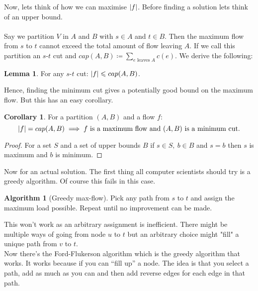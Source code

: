 \documentclass[11pt,a4paper, titlepage]{article}
\DeclarePairedDelimiter\abs{\lvert}{\rvert}
\theoremstyle{definition}
\newtheorem{corollary}[theorem]{Corollary}
\newtheorem{lemma}[theorem]{Lemma}
\newtheorem{algo}[theorem]{Algorithm}
\begin{document}
Now, lets think of how we can maximise $\abs{f}$. Before finding a solution lets think of an upper bound. 
\\
\\
Say we partition $V$ in $A$ and $B$ with $s \in A$ and $t \in B$. Then the maximum flow from $s$ to $t$ cannot exceed the total amount of flow leaving $A$. If we call this partition an $s$-$t$ cut and $cap(A,B) \coloneqq \displaystyle \sum_{e \text{ leaves } A} c(e)$. We derive the following:

\begin{lemma}
For any $s$-$t$ cut: $\abs{f} \leqslant cap(A,B)$. 
\end{lemma}

Hence, finding the minimum cut gives a potentially good bound on the maximum flow. But this has an easy corollary.

\begin{corollary}
For a partition $(A,B)$ and a flow $f$: 
\[
\abs{f} = cap(A,B) \implies f \text{ is a maximum flow and } (A,B) \text{ is a minimum cut.}	
\]
\end{corollary}
\begin{proof}
For a set $S$ and a set of upper bounds $B$ if $s\in S, \ b \in B$ and $s = b$ then $s$ is maximum and $b$ is minimum. 
\end{proof}

Now for an actual solution. The first thing all computer scientists should try is a greedy algorithm. Of course this fails in this case.

\begin{algo}[Greedy max-flow]
Pick any path from $s$ to $t$ and assign the maximum load possible. Repeat until no improvement can be made.
\end{algo}

This won't work as an arbitrary assignment is inefficient. There might be multiple ways of going from node $u$ to $t$ but an arbitrary choice might "fill" a unique path from $v$ to $t$.
\\
Now there's the Ford-Flukerson algorithm which is the greedy algorithm that works. It works because if you can ``fill up'' a node.
The idea is that you select a path, add as much as you can and then add reverse edges for each edge in that path. 
\end{document}
